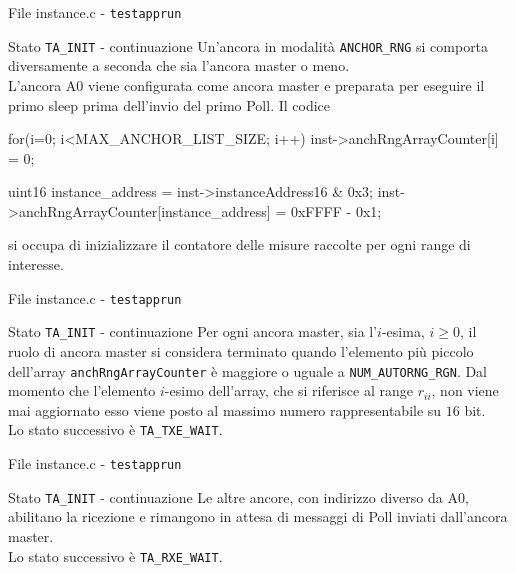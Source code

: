 \begin{frame}[fragile]{File instance.c - \lstinline[language=C]!testapprun!}
  \begin{block}{Stato \lstinline[language=C]!TA_INIT! - continuazione}
    Un'ancora in modalità \lstinline[language=C]!ANCHOR_RNG! si comporta diversamente a seconda che sia l'ancora master o meno.\\
    L'ancora A0 viene configurata come ancora master e preparata per eseguire il primo sleep prima dell'invio del primo Poll.
    Il codice
    \begin{C}
      for(i=0; i<MAX_ANCHOR_LIST_SIZE; i++)
          inst->anchRngArrayCounter[i] = 0;
      
      uint16 instance_address = inst->instanceAddress16 & 0x3;
      inst->anchRngArrayCounter[instance_address] = 0xFFFF - 0x1;
    \end{C}
    si occupa di inizializzare il contatore delle misure raccolte per ogni range di interesse.
  \end{block}
\end{frame}


\begin{frame}[fragile]{File instance.c - \lstinline[language=C]!testapprun!}
  \begin{block}{Stato \lstinline[language=C]!TA_INIT! - continuazione}
    Per ogni ancora master, sia l'$i$-esima, $i \ge 0$, il ruolo di ancora master si considera terminato
    quando l'elemento più piccolo dell'array \lstinline[language=C]!anchRngArrayCounter! è maggiore o uguale a
    \lstinline[language=C]!NUM_AUTORNG_RGN!. Dal momento che l'elemento $i$-esimo dell'array, che si riferisce al range
    $r_{ii}$, non viene mai aggiornato esso viene posto al massimo numero rappresentabile su $16$ bit.\\
    \alert{Lo stato successivo} è \lstinline[language=C]!TA_TXE_WAIT!.
  \end{block}
\end{frame}

\begin{frame}[fragile]{File instance.c - \lstinline[language=C]!testapprun!}
  \begin{block}{Stato \lstinline[language=C]!TA_INIT! - continuazione}
    Le altre ancore, con indirizzo diverso da A0, abilitano la ricezione
    e rimangono in attesa di messaggi di Poll inviati dall'ancora master.\\
    \alert{Lo stato successivo} è \lstinline[language=C]!TA_RXE_WAIT!.
  \end{block}
\end{frame}

